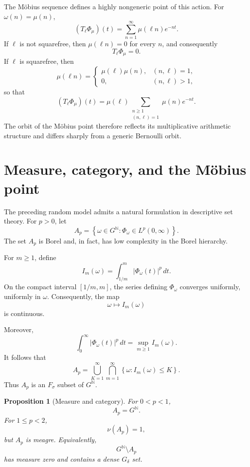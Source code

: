 \documentclass[11pt]{article}
\newtheorem{proposition}[theorem]{Proposition}
\theoremstyle{remark}
\begin{document}
The Möbius sequence defines a highly nongeneric point of this action.
For \(\omega(n)=\mu(n)\),
\[
(T_\ell\Phi_\mu)(t)
=
\sum_{n=1}^{\infty}\mu(\ell n)e^{-nt}.
\]
If \(\ell\) is not squarefree, then \(\mu(\ell n)=0\) for every \(n\),
and consequently
\[
T_\ell\Phi_\mu=0.
\]
If \(\ell\) is squarefree, then
\[
\mu(\ell n)
=
\begin{cases}
\mu(\ell)\mu(n),&(n,\ell)=1,\\
0,&(n,\ell)>1,
\end{cases}
\]
so that
\[
(T_\ell\Phi_\mu)(t)
=
\mu(\ell)
\sum_{\substack{n\geq1\\(n,\ell)=1}}
\mu(n)e^{-nt}.
\]
The orbit of the Möbius point therefore reflects its multiplicative
arithmetic structure and differs sharply from a generic Bernoulli
orbit.


\section{Measure, category, and the Möbius point}
\label{sec:measure-category}

The preceding random model admits a natural formulation in descriptive
set theory.  For \(p>0\), let
\[
A_p=
\left\{
\omega\in G^{\mathbb N}:
\Phi_\omega\in L^p(0,\infty)
\right\}.
\]
The set \(A_p\) is Borel and, in fact, has low complexity in the Borel
hierarchy.

For \(m\geq1\), define
\[
I_m(\omega)
=
\int_{1/m}^{m}|\Phi_\omega(t)|^p\,dt.
\]
On the compact interval \([1/m,m]\), the series defining
\(\Phi_\omega\) converges uniformly, uniformly in \(\omega\).
Consequently, the map
\[
\omega\longmapsto I_m(\omega)
\]
is continuous.

Moreover,
\[
\int_0^\infty|\Phi_\omega(t)|^p\,dt
=
\sup_{m\geq1}I_m(\omega).
\]
It follows that
\[
A_p
=
\bigcup_{K=1}^{\infty}
\bigcap_{m=1}^{\infty}
\left\{
\omega:I_m(\omega)\leq K
\right\}.
\]
Thus \(A_p\) is an \(F_\sigma\) subset of \(G^{\mathbb N}\).

\begin{proposition}[Measure and category]
\label{prop:measure-category}
For \(0<p<1\),
\[
A_p=G^{\mathbb N}.
\]
For \(1\leq p<2\),
\[
\nu(A_p)=1,
\]
but \(A_p\) is meagre.  Equivalently,
\[
G^{\mathbb N}\setminus A_p
\]
has measure zero and contains a dense \(G_\delta\) set.
\end{proposition}
\end{document}

